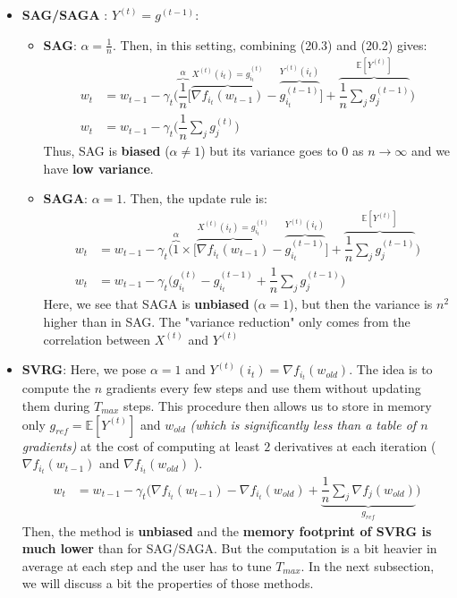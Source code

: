 \documentclass[12pt]{report}
\begin{document}
\begin{itemize}
    \item \textbf{SAG/SAGA} : $Y^{(t)}=g^{(t-1)}$:
    \begin{itemize}
        \item \textbf{SAG}: $\alpha = \frac{1}{n}$. Then, in this setting, combining (20.3) and (20.2) gives:
        \begin{align}
            w_{t} &= w_{t-1} - \gamma_t \Big( \overbrace{\dfrac{1}{n}}^{\alpha} \big[ \overbrace{\nabla f_{i_t}(w_{t-1})}^{X^{(t)}(i_t) = g_{i_t}^{(t)}} - \overbrace{g_{i_t}^{(t-1)}}^{Y^{(t)}(i_t)} \big] + \overbrace{\dfrac{1}{n}\sum_j g_j^{(t-1)}}^{\mathbb{E}[Y^{(t)}]} \Big) \\
            w_{t} &= w_{t-1} - \gamma_t \Big(\dfrac{1}{n}\sum_j g_j^{(t)} \Big)
        \end{align}
        Thus, SAG is \textbf{biased} ($\alpha \neq 1$) but its variance goes to $0$ as $n \rightarrow \infty$ and we have \textbf{low variance}.
        
        \item \textbf{SAGA}: $\alpha = 1$. Then, the update rule is:
        \begin{align}
            w_{t} &= w_{t-1} - \gamma_t \Big( \overbrace{1}^{\alpha} \times \big[\overbrace{\nabla f_{i_t}(w_{t-1})}^{X^{(t)}(i_t) = g_{i_t}^{(t)}} - \overbrace{g_{i_t}^{(t-1)}}^{Y^{(t)}(i_t)} \big] + \overbrace{\dfrac{1}{n}\sum_j g_j^{(t-1)}}^{\mathbb{E}[Y^{(t)}]} \Big) \\
            w_{t} &= w_{t-1} - \gamma_t \Big(g_{i_t}^{(t)} - g_{i_t}^{(t-1)} + \dfrac{1}{n}\sum_j g_j^{(t-1)} \Big)
        \end{align}
        Here, we see that SAGA is \textbf{unbiased} ($\alpha=1$), but then the variance is $n^2$ higher than in SAG. The "variance reduction" only comes from the correlation between $X^{(t)}$ and $Y^{(t)}$
    \end{itemize}
    
    \item \textbf{SVRG}: Here, we pose $\alpha = 1$ and $Y^{(t)}(i_t) = \nabla f_{i_t}(w_{old})$. The idea is to compute the $n$ gradients every few steps and use them without updating them during $T_{max}$ steps. This procedure then allows us to store in memory only $g_{ref} = \mathbb{E}[Y^{(t)}]$ and $w_{old}$ \textit{(which is significantly less than a table of $n$ gradients)} at the cost of computing at least $2$ derivatives at each iteration ($\nabla f_{i_t}(w_{t-1})$ and $\nabla f_{i_t}(w_{old})$ ).
    \begin{align}
            w_{t} &= w_{t-1} - \gamma_t \Big(\nabla f_{i_t}(w_{t-1}) - \nabla f_{i_t}(w_{old}) + \underbrace{\dfrac{1}{n}\sum_j \nabla f_{j}(w_{old})}_{g_{ref}} \Big)
    \end{align}
    Then, the method is \textbf{unbiased} and the \textbf{memory footprint of SVRG is much lower} than for SAG/SAGA. But the computation is a bit heavier in average at each step and the user has to tune $T_{max}$. In the next subsection, we will discuss a bit the properties of those methods.
\end{itemize}
\end{document}
